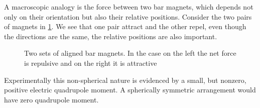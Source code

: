 \documentclass[fleqn]{NotesClass}
\begin{document}
    A macroscopic analogy is the force between two bar magnets, which depends not only on their orientation but also their relative positions.
    Consider the two pairs of magnets in \cref{fig:bar magnets}.
    We see that one pair attract and the other repel, even though the directions are the same, the relative positions are also important.
    
    \begin{figure}
        \caption{Two sets of aligned bar magnets. In the case on the left the net force is repulsive and on the right it is attractive}
        \label{fig:bar magnets}
    \end{figure}
    
    Experimentally this non-spherical nature is evidenced by a small, but nonzero, positive electric quadrupole moment.
    A spherically symmetric arrangement would have zero quadrupole moment.
    
\end{document}
